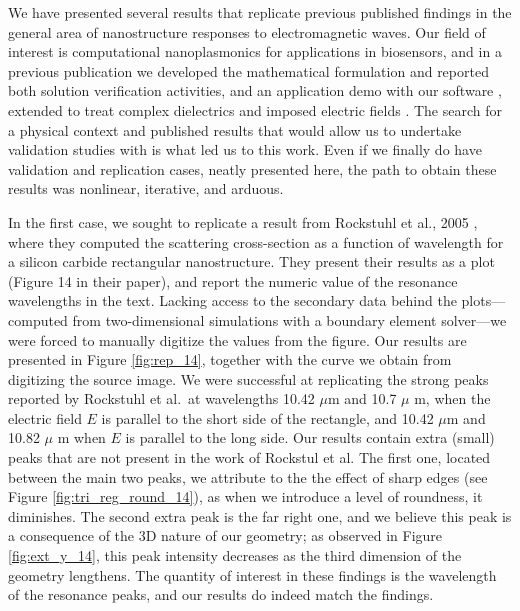 
We have presented several results that replicate previous published findings in the general area of nanostructure responses to electromagnetic waves. 
Our field of interest is computational nanoplasmonics for applications in biosensors, and in a previous publication we developed the mathematical formulation and reported both solution verification activities, and an application demo with our software \pygbe, extended to treat complex dielectrics and imposed electric fields \cite{ClementiETal2019}.
The search for a physical context and published results that would allow us to undertake validation studies with \pygbe is what led us to this work. 
Even if we finally do have validation and replication cases, neatly presented here, the path to obtain these results was nonlinear, iterative, and arduous.

In the first case, we sought to replicate a result from Rockstuhl et al., 2005 \cite{rockstuhl2005}, where they computed the scattering cross-section as a function of wavelength for a silicon carbide rectangular nanostructure. 
They present their results as a plot (Figure 14 in their paper), and report the numeric value of the resonance wavelengths in the text. 
Lacking access to the secondary data behind the plots---computed from two-dimensional simulations with a boundary element solver---we were forced to manually digitize the values from the figure.
Our results are presented in Figure \ref{fig:rep_14}, together with the curve we obtain from digitizing the source image. 
We were successful at replicating the strong peaks reported  by Rockstuhl et al.\ at wavelengths
10.42 $\mu$m and 10.7 $\mu$ m,  when the electric field $E$ is parallel to the short side of the rectangle, and 10.42 $\mu$m and 10.82 $\mu$ m
when $E$ is parallel to the long side. Our results contain extra (small) peaks that are not present in the work of Rockstul et al.
The first one, located between the main two peaks, we attribute to the the effect of
sharp edges (see Figure \ref{fig:tri_reg_round_14}), as when we introduce a level of roundness, it diminishes. The second extra peak is the far right one, and we believe this
peak is a consequence of the 3D nature of our geometry; as observed in Figure \ref{fig:ext_y_14}, this peak intensity
decreases as the third dimension of the geometry lengthens.
The quantity of interest in these findings is the wavelength of the resonance peaks, and our results do indeed match the findings.

